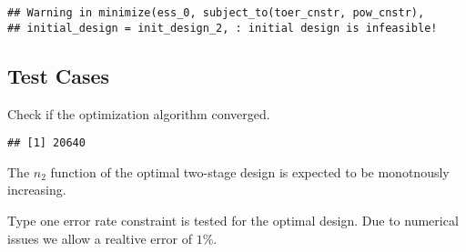 \documentclass[]{book}
\newenvironment{Shaded}{\begin{snugshade}}{\end{snugshade}}
\newcommand{\DecValTok}[1]{\textcolor[rgb]{0.00,0.00,0.81}{#1}}
\newcommand{\KeywordTok}[1]{\textcolor[rgb]{0.13,0.29,0.53}{\textbf{#1}}}
\newcommand{\NormalTok}[1]{#1}
\newcommand{\OperatorTok}[1]{\textcolor[rgb]{0.81,0.36,0.00}{\textbf{#1}}}
\newcommand{\StringTok}[1]{\textcolor[rgb]{0.31,0.60,0.02}{#1}}
\begin{document}
\begin{verbatim}
## Warning in minimize(ess_0, subject_to(toer_cnstr, pow_cnstr),
## initial_design = init_design_2, : initial design is infeasible!
\end{verbatim}

\hypertarget{test-cases-1}{%
\subsection{Test Cases}\label{test-cases-1}}

Check if the optimization algorithm converged.

\begin{Shaded}
\end{Shaded}

\begin{verbatim}
## [1] 20640
\end{verbatim}

\begin{Shaded}
\end{Shaded}

The \(n_2\) function of the optimal two-stage design is expected to be
monotnously increasing.

\begin{Shaded}
\end{Shaded}

Type one error rate constraint is tested for the optimal design.
Due to numerical issues we allow a realtive error of \(1\%\).
\end{document}
